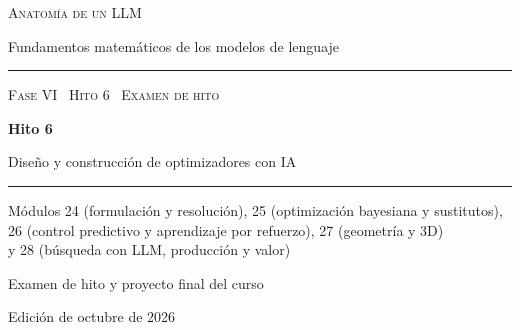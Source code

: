 \documentclass[11pt,a4paper,twoside,openany]{book}
\renewcommand{\thechapter}{\Alph{chapter}}
\begin{document}
\frontmatter
\begin{titlepage}
\centering
\vspace*{2.5cm}
{\large\scshape Anatomía de un LLM}\par
\vspace{0.4cm}
{\normalsize Fundamentos matemáticos de los modelos de lenguaje}\par
\vspace{2.2cm}
\rule{\textwidth}{0.8pt}\par\vspace{0.5cm}
{\small\scshape Fase VI \textperiodcentered\ Hito 6 \textperiodcentered\ Examen de hito}\par\vspace{0.3cm}
{\Huge\bfseries Hito 6\par}\vspace{0.3cm}
{\LARGE Diseño y construcción de optimizadores con IA\par}
\vspace{0.5cm}\rule{\textwidth}{0.4pt}\par
\vspace{1.0cm}
{\normalsize Módulos 24 (formulación y resolución), 25 (optimización bayesiana y sustitutos),\\ 26 (control predictivo y aprendizaje por refuerzo), 27 (geometría y 3D)\\ y 28 (búsqueda con LLM, producción y valor)\par}
\vspace{1.4cm}
{\large Examen de hito y proyecto final del curso\par}
\vfill
{\small Edición de octubre de 2026}\par
\end{titlepage}



\tableofcontents

\mainmatter




\appendix
\renewcommand{\thechapter}{\Roman{chapter}}





\backmatter

\end{document}
